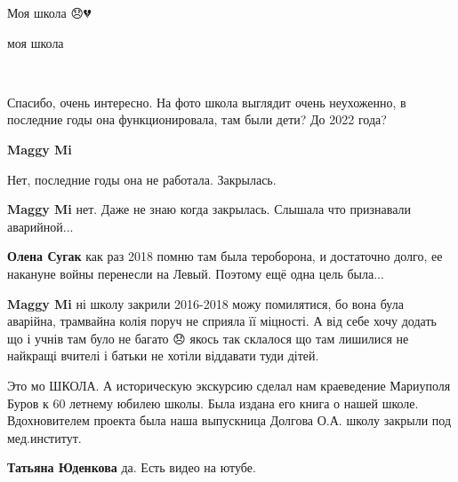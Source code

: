  
 
 
 
 

\qqSecCmt


Моя школа 😞💔


моя школа


🥺


Спасибо, очень интересно. На фото школа выглядит очень неухоженно, в последние
годы она функционировала, там были дети? До 2022 года?

\begin{itemize} %
\textbf{Maggy Mi}

Нет, последние годы она не работала. Закрылась.

\textbf{Maggy Mi} нет. Даже не знаю когда закрылась. Слышала что признавали аварийной...

\textbf{Олена Сугак} как раз 2018 помню там была тероборона, и достаточно долго, ее накануне войны перенесли на Левый. Поэтому ещё одна цель была...

\textbf{Maggy Mi} ні школу закрили 2016-2018 можу помилятися, бо вона була аварійна,
трамвайна колія поруч не сприяла її міцності. А від себе хочу додать що і учнів
там було не багато 😞 якось так склалося що там лишилися не найкращі вчителі і
батьки не хотіли віддавати туди дітей.

\end{itemize} %


Это мо ШКОЛА. А историческую экскурсию сделал нам краеведение Мариуполя Буров к
60 летнему юбилею школы. Была издана его книга о нашей школе. Вдохновителем
проекта была наша выпускница Долгова О.А. школу закрыли под мед.институт.

\begin{itemize} %
\textbf{Татьяна Юденкова} да. Есть видео на ютубе.
\end{itemize} %

